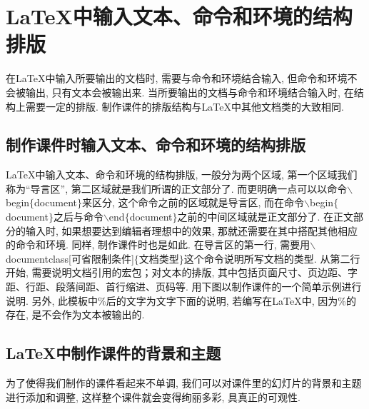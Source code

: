 \section{\LaTeX{}中输入文本、命令和环境的结构排版}

在\LaTeX{}中输入所要输出的文档时, 需要与命令和环境结合输入, 但命令和环境不会被输出, 只有文本会被输出来. 当所要输出的文档与命令和环境结合输入时, 在结构上需要一定的排版. 制作课件的排版结构与\LaTeX{}中其他文档类的大致相同.
\subsection{制作课件时输入文本、命令和环境的结构排版}

\LaTeX{}中输入文本、命令和环境的结构排版, 一般分为两个区域, 第一个区域我们称为“导言区”, 第二区域就是我们所谓的正文部分了. 而更明确一点可以以命令$\backslash$begin$\{$document$\}$来区分, 这个命令之前的区域就是导言区, 而在命令$\backslash$begin$\{$documen\-t$\}$之后与命令$\backslash$end$\{$document$\}$之前的中间区域就是正文部分了. 在正文部分的输入时, 如果想要达到编辑者理想中的效果, 那就还需要在其中搭配其他相应的命令和环境. 同样, 制作课件时也是如此. 在导言区的第一行, 需要用$\backslash$documentclass[可省限制条件]$\{$文档类型$\}$这个命令说明所写文档的类型. 从第二行开始, 需要说明文档引用的宏包；对文本的排版, 其中包括页面尺寸、页边距、字距、行距、段落间距、首行缩进、页码等. 用下图以制作课件的一个简单示例进行说明. 另外, 此模板中\%后的文字为文字下面的说明, 若编写在\LaTeX{}中, 因为\%的存在, 是不会作为文本被输出的.

\subsection{\LaTeX{}中制作课件的背景和主题}
为了使得我们制作的课件看起来不单调, 我们可以对课件里的幻灯片的背景和主题进行添加和调整, 这样整个课件就会变得绚丽多彩, 具真正的可观性.

